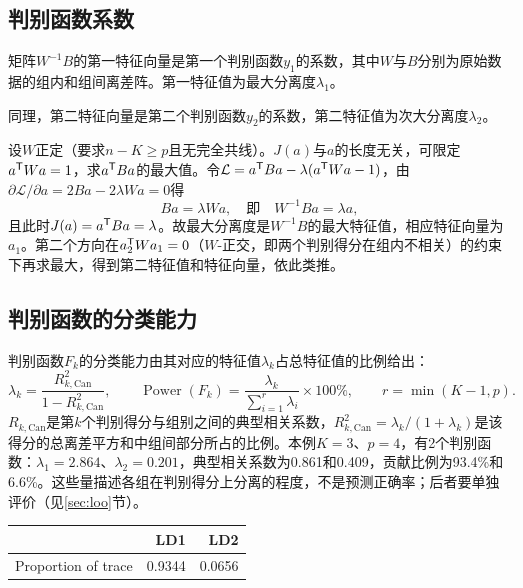 \subsection{判别函数系数}
矩阵$W^{-1}B$的第一特征向量是第一个判别函数$y_1$的系数，其中$W$与$B$分别为原始数据的组内和组间离差阵。第一特征值为最大分离度$\lambda_1$。

同理，第二特征向量是第二个判别函数$y_2$的系数，第二特征值为次大分离度$\lambda_2$。
\begin{zm}
设$W$正定（要求$n-K\geqslant p$且无完全共线）。$J(a)$与$a$的长度无关，可限定$a^{\mathsf T} Wa=1$，求$a^{\mathsf T} Ba$的最大值。令$\mathcal L=a^{\mathsf T} Ba-\lambda(a^{\mathsf T} Wa-1)$，由$\partial\mathcal L/\partial a=2Ba-2\lambda Wa=0$得
\[
Ba=\lambda Wa,\quad\text{即}\quad W^{-1}Ba=\lambda a,
\]
且此时$J(a)=a^{\mathsf T} Ba=\lambda$。故最大分离度是$W^{-1}B$的最大特征值，相应特征向量为$a_1$。第二个方向在$a_2^{\mathsf T} Wa_1=0$（$W$-正交，即两个判别得分在组内不相关）的约束下再求最大，得到第二特征值和特征向量，依此类推。
\end{zm}
\subsection{判别函数的分类能力}
判别函数$F_k$的分类能力由其对应的特征值$\lambda_k$占总特征值的比例给出：
\begin{equation}
\lambda_k=\frac{R_{k,\mathrm{Can}}^2}{1-R_{k,\mathrm{Can}}^2},\qquad
\operatorname{Power}(F_k)=\frac{\lambda_k}{\sum_{i=1}^r\lambda_i}\times100\%,\qquad r=\min(K-1,p).
\end{equation}
$R_{k,\mathrm{Can}}$是第$k$个判别得分与组别之间的典型相关系数，$R_{k,\mathrm{Can}}^2=\lambda_k/(1+\lambda_k)$是该得分的总离差平方和中组间部分所占的比例。本例$K=3$、$p=4$，有2个判别函数：$\lambda_1=2.864$、$\lambda_2=0.201$，典型相关系数为0.861和0.409，贡献比例为93.4\%和6.6\%。这些量描述各组在判别得分上分离的程度，不是预测正确率；后者要单独评价（见\ref{sec:loo}节）。
\begin{center}\begin{tabular}{lrr}\toprule
&{\bfseries LD1}&{\bfseries LD2}\\\midrule
Proportion of trace&0.9344&0.0656\\\bottomrule
\end{tabular}\end{center}
